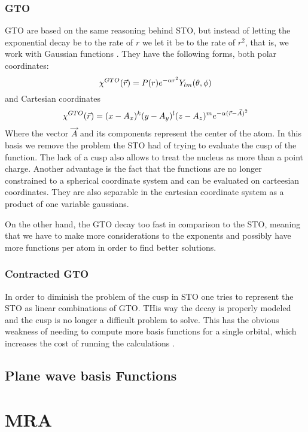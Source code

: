 \documentclass[../master_thesis.tex]{subfiles}
\begin{document}
\subsubsection{\ac{GTO}}
\ac{GTO} are based on the same reasoning behind \ac{STO}, but instead of letting
the exponential decay be to the rate of  $r$ we let it be to the rate of $r^2$,
that is, we work with Gaussian functions \cite{ESQCB1P1}.
They have the following
forms, both polar coordinates:
\begin{equation}
  \chi^{GTO}(\vec{r}) = P(r)e^{-\alpha r^2}Y_{lm}(\theta, \phi)
\end{equation}
and Cartesian coordinates
\begin{equation}
\chi^{GTO}(\vec{r}) = (x - A_x)^k(y - A_y)^l(z - A_z)^me^{-\alpha(\vec{r} - \vec{A})^2}
\end{equation}
Where the vector $\vec{A}$ and its components represent the center of the atom.
In this basis we remove the problem the \ac{STO} had of trying to evaluate the
cusp of the function. The lack of a cusp also allows to treat the nucleus as
more than a point charge. Another advantage is the fact that the functions are no
longer constrained to a spherical coordinate system and can be evaluated on carteesian
coordinates. They are also separable in the cartesian coordinate system as a product of
one variable gaussians.

On the other hand, the \ac{GTO} decay too fast in comparison to the \ac{STO},
meaning that we have to make more considerations to the exponents and possibly have more
functions per atom in order to find better solutions.
\subsubsection{Contracted \ac{GTO}}
In order to diminish the problem of the cusp in \ac{STO} one tries to represent the
\ac{STO} as linear combinations of \ac{GTO}. THis way the decay is properly modeled and the
cusp is no longer a difficult problem to solve. This has the obvious weakness of needing
to compute more basis functions for a single orbital, which increases the cost of running
the calculations \cite{Cramer:2004}. %
\subsection{Plane wave basis Functions}

\section{\ac{MRA}}
\end{document}
